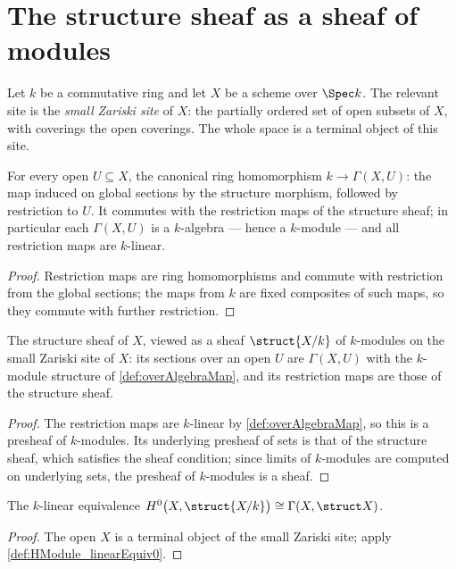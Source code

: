 \section{The structure sheaf as a sheaf of modules}

Let \(k\) be a commutative ring and let \(X\) be a scheme over \(\Spec k\). The relevant site
is the \emph{small Zariski site} of \(X\): the partially ordered set of open subsets of
\(X\), with coverings the open coverings. The whole space is a terminal object of this site.

\begin{definition}
  \label{def:overAlgebraMap}
  \leanok
  For every open \(U \subseteq X\), the canonical ring homomorphism \(k \to \Gamma(X, U)\):
  the map induced on global sections by the structure morphism, followed by restriction to
  \(U\). It commutes with the restriction maps of the structure sheaf; in particular each
  \(\Gamma(X, U)\) is a \(k\)-algebra --- hence a \(k\)-module --- and all restriction maps
  are \(k\)-linear.
\end{definition}
\begin{proof}
  \leanok
  Restriction maps are ring homomorphisms and commute with restriction from the global
  sections; the maps from \(k\) are fixed composites of such maps, so they commute with
  further restriction.
\end{proof}

\begin{definition}
  \label{def:moduleKSheaf}
  \leanok
  The structure sheaf of \(X\), viewed as a sheaf \(\struct{X/k}\) of \(k\)-modules on the
  small Zariski site of \(X\): its sections over an open \(U\) are \(\Gamma(X, U)\) with the
  \(k\)-module structure of \ref{def:overAlgebraMap}, and its restriction maps are those of
  the structure sheaf.
\end{definition}
\begin{proof}
  \leanok
  The restriction maps are \(k\)-linear by \ref{def:overAlgebraMap}, so this is a presheaf of
  \(k\)-modules. Its underlying presheaf of sets is that of the structure sheaf, which
  satisfies the sheaf condition; since limits of \(k\)-modules are computed on underlying
  sets, the presheaf of \(k\)-modules is a sheaf.
\end{proof}

\begin{definition}
  \label{def:moduleKSheafHZero}
  \leanok
  The \(k\)-linear equivalence \(H^0\bigl(X, \struct{X/k}\bigr) \cong \Gamma(X, \struct X)\).
\end{definition}
\begin{proof}
  \leanok
  The open \(X\) is a terminal object of the small Zariski site; apply
  \ref{def:HModule_linearEquiv0}.
\end{proof}

